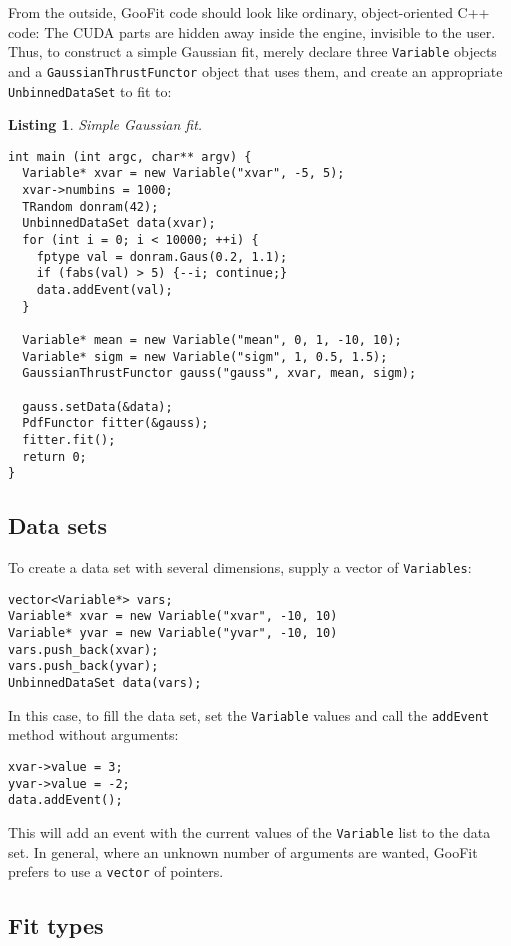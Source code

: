 \documentclass[12pt,pdflatex]{article}
\newtheorem{listing}{Listing}
\begin{document}
From the outside, GooFit code should look like ordinary,
object-oriented C++ code: The CUDA parts are hidden away
inside the engine, invisible to the user. Thus, to construct
a simple Gaussian fit, merely declare three \texttt{Variable}
objects and a \texttt{GaussianThrustFunctor} object that uses them,
and create an appropriate \texttt{UnbinnedDataSet} to fit to:
\begin{listing}
\label{listing:gaussfit}
Simple Gaussian fit.

\begin{verbatim}
int main (int argc, char** argv) {
  Variable* xvar = new Variable("xvar", -5, 5); 
  xvar->numbins = 1000; 
  TRandom donram(42); 
  UnbinnedDataSet data(xvar);
  for (int i = 0; i < 10000; ++i) {
    fptype val = donram.Gaus(0.2, 1.1);
    if (fabs(val) > 5) {--i; continue;} 
    data.addEvent(val); 
  }

  Variable* mean = new Variable("mean", 0, 1, -10, 10);
  Variable* sigm = new Variable("sigm", 1, 0.5, 1.5); 
  GaussianThrustFunctor gauss("gauss", xvar, mean, sigm); 

  gauss.setData(&data);
  PdfFunctor fitter(&gauss); 
  fitter.fit(); 
  return 0;
}
\end{verbatim}
\end{listing} 

\subsection{Data sets}

To create a data set with several dimensions, supply a vector
of \texttt{Variables}:
\begin{verbatim}
vector<Variable*> vars;
Variable* xvar = new Variable("xvar", -10, 10)
Variable* yvar = new Variable("yvar", -10, 10)
vars.push_back(xvar);
vars.push_back(yvar);
UnbinnedDataSet data(vars);
\end{verbatim}
In this case, to fill the data set, set the \texttt{Variable}
values and call the \texttt{addEvent} method without arguments:
\begin{verbatim}
xvar->value = 3;
yvar->value = -2;
data.addEvent();
\end{verbatim}
This will add an event with the current values of the \texttt{Variable}
list to the data set. In general, where an unknown number of arguments
are wanted, GooFit prefers to use a \texttt{vector} of pointers. 

\subsection{Fit types} 
\end{document}

